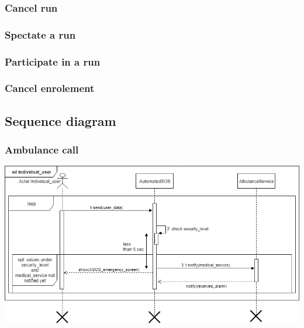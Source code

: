 \subsubsection{Cancel run}

\clearpage
\subsubsection{Spectate a run}

\clearpage
\subsubsection{Participate in a run}

\clearpage
\subsubsection{Cancel enrolement}


\clearpage
\subsection{Sequence diagram}
\subsubsection{Ambulance call}
\includegraphics[scale = 0.5]{sections/requirements/sequenceDiagrams/ASOS.png}
\clearpage
